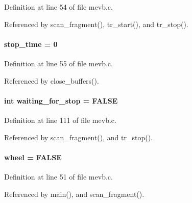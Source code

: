 Definition at line 54 of file mevb.c.

Referenced by scan\_\-fragment(), tr\_\-start(), and tr\_\-stop().
\paragraph[{stop\_\-time}]{ {\bf stop\_\-time} = 0}\hfill\label{mevb_8c_aa27c44984703cbd8fb250f9d117470c5}


Definition at line 55 of file mevb.c.

Referenced by close\_\-buffers().
\paragraph[{waiting\_\-for\_\-stop}]{\setlength{\rightskip}{0pt plus 5cm}int {\bf waiting\_\-for\_\-stop} = FALSE}\hfill\label{mevb_8c_aa819b0f18f39d3f5f9da24c951d61cd8}


Definition at line 111 of file mevb.c.

Referenced by scan\_\-fragment(), and tr\_\-stop().
\paragraph[{wheel}]{ {\bf wheel} = FALSE}\hfill\label{mevb_8c_a9380288545f4ad20cbcfde18c079f4a0}


Definition at line 51 of file mevb.c.

Referenced by main(), and scan\_\-fragment().